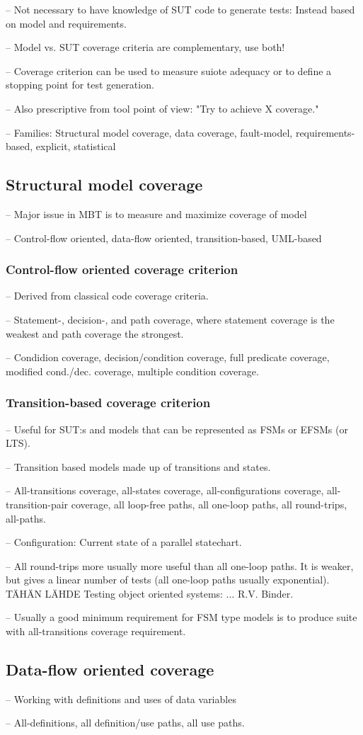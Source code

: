 -- Not necessary to have knowledge of SUT code to generate tests: Instead based on model and requirements.

-- Model vs. SUT coverage criteria are complementary, use both!

-- Coverage criterion can be used to measure suiote adequacy or to define a stopping point for test generation.

-- Also prescriptive from tool point of view: "Try to achieve X coverage."

-- Families: Structural model coverage, data coverage, fault-model, requirements-based, explicit, statistical

\subsection{Structural model coverage}
-- Major issue in MBT is to measure and maximize coverage of model

-- Control-flow oriented, data-flow oriented, transition-based, UML-based

\subsubsection{Control-flow oriented coverage criterion}
--  Derived from classical code coverage criteria.

-- Statement-, decision-, and path coverage, where statement coverage is the weakest and path coverage the strongest.

-- Condidion coverage, decision/condition coverage, full predicate coverage, modified cond./dec. coverage, multiple condition coverage.

\subsubsection{Transition-based coverage criterion}
-- Useful for SUT:s and models that can be represented as FSMs or EFSMs (or LTS).

-- Transition based models made up of transitions and states.

-- All-transitions coverage, all-states coverage, all-configurations coverage, all-transition-pair coverage, all loop-free paths, all one-loop paths, all round-trips, all-paths.

-- Configuration: Current state of a parallel statechart.

-- All round-trips more usually more useful than all one-loop paths. It is weaker, but gives a linear number of tests (all one-loop paths usually exponential). TÄHÄN LÄHDE Testing object oriented systems: ... R.V. Binder.

-- Usually a good minimum requirement for FSM type models is to produce suite with all-transitions coverage requirement.

\subsection{Data-flow oriented coverage}
-- Working with definitions and uses of data variables

-- All-definitions, all definition/use paths, all use paths.